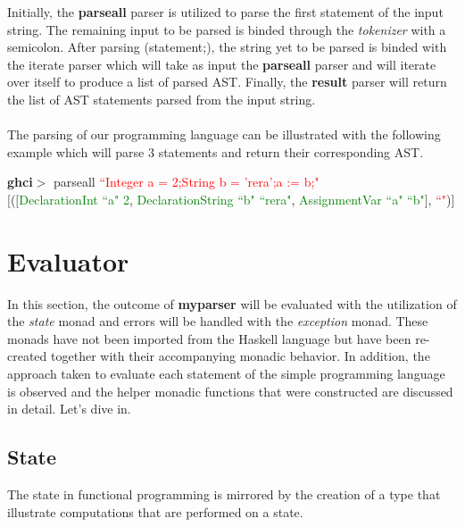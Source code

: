 \documentclass[a4paper, onecolumn]{article}
\begin{document}
    \noindent Initially, the \textbf{parse\textunderscore all} parser is utilized to parse the first statement of the input string. The remaining input to be parsed is binded through the \textit{tokenizer} with a semicolon. After parsing (statement;), the string yet to be parsed is binded with the iterate parser which will take as input the \textbf{parse\textunderscore all} parser and will iterate over itself to produce a list of parsed AST. Finally, the \textbf{result} parser will return the list of AST statements parsed from the input string. \\ \\
    The parsing of our programming language can be illustrated with the following example which will parse 3 statements and return their corresponding AST. 
    
    
    \begin{center}
            \textbf{ghci$>$} parse\textunderscore all \textcolor{red}{``Integer a = 2;String b = 'rera';a := b;"} \\
             $\big[$($\big[$\textcolor{green}{DeclarationInt ``a" 2}, \textcolor{green}{DeclarationString ``b" ``rera"}, \textcolor{green}{AssignmentVar ``a" ``b"}$\big]$, \textcolor{red}{``"})]
        \end{center}
        
    \section{Evaluator}
    
    In this section, the outcome of \textbf{my\textunderscore parser} will be evaluated with the utilization of the \textit{state} monad and errors will be handled with the \textit{exception} monad. These monads have not been imported from the Haskell language but have been re-created together with their accompanying monadic behavior. In addition, the approach taken to evaluate each statement of the simple programming language is observed and the helper monadic functions that were constructed are discussed in detail. Let's dive in. 
    
    \subsection{State}
    
    The state in functional programming is mirrored by the creation of a type that illustrate computations that are performed on a state. 
    
\end{document}

